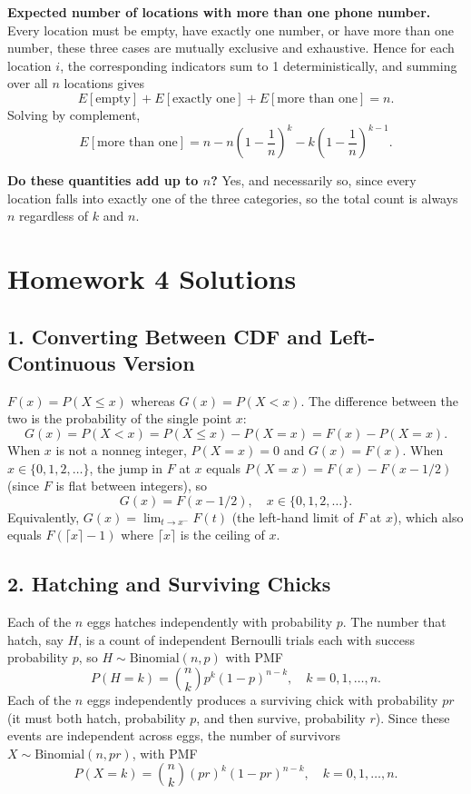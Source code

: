 \documentclass{article}
\begin{document}
\bigskip
\textbf{Expected number of locations with more than one phone number.}
Every location must be empty, have exactly one number, or have more than one
number, these three cases are mutually exclusive and exhaustive. Hence for
each location $i$, the corresponding indicators sum to 1 deterministically,
and summing over all $n$ locations gives
\[
    E[\text{empty}] + E[\text{exactly one}] + E[\text{more than one}] = n.
\]
Solving by complement,
\[
    E[\text{more than one}] = n - n\!\left(1-\frac{1}{n}\right)^{\!k}
                                  - k\!\left(1-\frac{1}{n}\right)^{\!k-1}.
\]

\bigskip
\textbf{Do these quantities add up to $n$?} Yes, and necessarily so, since
every location falls into exactly one of the three categories, so the total
count is always $n$ regardless of $k$ and $n$.

\bigskip
\section*{Homework 4 Solutions}

\subsection*{1. Converting Between CDF and Left-Continuous Version}

$F(x)=P(X\le x)$ whereas $G(x)=P(X<x)$. The difference between the two is the probability of the single point $x$:
$$
G(x)=P(X<x)=P(X\le x)-P(X=x)=F(x)-P(X=x).
$$
When $x$ is not a nonneg integer, $P(X=x)=0$ and $G(x)=F(x)$. When $x\in\{0,1,2,\dots\}$, the jump in $F$ at $x$ equals $P(X=x)=F(x)-F(x-1/2)$ (since $F$ is flat between integers), so
$$
G(x)=F(x-1/2), \quad x\in\{0,1,2,\dots\}.
$$
Equivalently, $G(x)=\lim_{t\to x^-}F(t)$ (the left-hand limit of $F$ at $x$), which also equals $F(\lceil x\rceil-1)$ where $\lceil x\rceil$ is the ceiling of $x$.

\subsection*{2. Hatching and Surviving Chicks}

Each of the $n$ eggs hatches independently with probability $p$. The number that hatch, say $H$, is a count of independent Bernoulli trials each with success probability $p$, so $H\sim\text{Binomial}(n,p)$ with PMF
$$
P(H=k)=\binom{n}{k}p^k(1-p)^{n-k}, \quad k=0,1,\dots,n.
$$
Each of the $n$ eggs independently produces a surviving chick with probability $pr$ (it must both hatch, probability $p$, and then survive, probability $r$). Since these events are independent across eggs, the number of survivors $X\sim\text{Binomial}(n,pr)$, with PMF
$$
P(X=k)=\binom{n}{k}(pr)^k(1-pr)^{n-k}, \quad k=0,1,\dots,n.
$$
\end{document}
